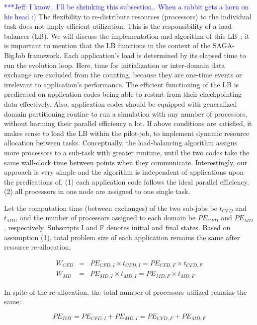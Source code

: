 \documentclass[conference,final]{IEEEtran}
\newcommand{\skonote}[1]{ {\textcolor{blue} { ***Jeff: #1 }}}
\newcommand{\skonote}[1]{}
\begin{document}
\skonote{I know.. I'll be shrinking this subsection.. When a rabbit gets a horn on his head :) }
The flexibility to re-distribute resources (processors) to the individual task does not imply efficient utilization. This is the responsibility of a load-balancer (LB). We will discuss the implementation and algorithm of this LB~\cite{Ko}; it is important to mention that the LB functions in the context of the SAGA-BigJob framework.
Each application's load is determined by its elapsed time to run the evolution loop. Here, time for initialization or inter-domain data exchange are excluded from the counting, because they are one-time events or irrelevant to application's performance.  The efficient functioning of the LB is predicated on application codes being able to restart from their checkpointing data effectively.  Also, application codes should be equipped with generalized domain partitioning routine to run a simulation with any number of processors, without harming their parallel efficiency a lot. If above conditions are satisfied, it makes sense to load the LB within the pilot-job, to implement dynamic resource allocation between tasks.  Conceptually, the load-balancing algorithm assigns more processors to a sub-task with greater runtime, until the two codes take the same wall-clock time between points when they communicate.
Interestingly, our approach is very simple and the algorithm is independent of applications upon the predications of,
(1) each application code follows the ideal parallel efficiency.
(2) all processors in one node are assigned to one single task.

Let the computation time (between exchanges) of the two sub-jobs be $t_{CFD}$ and $t_{MD}$, and the number of processors assigned to each domain be $PE_{CFD}$ and $PE_{MD}$, respectively. Subscripts I and F denotes initial and final states. Based on assumption (1), total problem size of each application remains the same after resource re-allocation,

\vspace{-.2em}
\footnotesize
\begin{eqnarray}
W_{CFD}&=&PE_{CFD,I}\times t_{CFD,I}=PE_{CFD,F}\times t_{CFD,F} \nonumber \\
W_{MD}&=&PE_{MD,I}\times t_{MD,I}=PE_{MD,F}\times t_{MD,F}
\label{eq:SimTime_EachTask}
\end{eqnarray}
\normalsize

In spite of the re-allocation, the total number of processors utilized remains the same:

\vspace{-.2em}
\footnotesize
\begin{equation}
PE_{TOT}=PE_{CFD,I}+PE_{MD,I}=PE_{CFD,F}+PE_{MD,F}
\label{eq:PECondition}
\end{equation}
\normalsize
\end{document}
